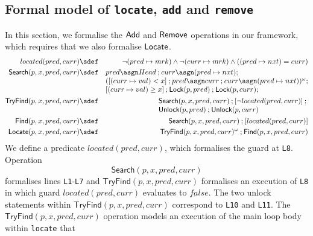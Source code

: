 \documentclass{article}
\theoremstyle{plain}
\theoremstyle{definition}
\def\ch{\mathbin{;}}
\begin{document}
\subsection{Formal model of \texttt{locate}, \texttt{add} and
  \texttt{remove}} 

In this section, we formalise the ${\sf Add}$ and ${\sf Remove}$
operations in our framework, which requires that we also formalise
${\sf Locate}$.
\begin{eqnarray*}
  located(pred,curr) & \sdef & \neg
  (pred\mapsto mrk) \land \neg (curr\mapsto mrk) \land
  ((pred\mapsto nxt) = curr) \\
  \mathsf{Search}(p, x, pred, curr) & \sdef & 
  \begin{array}[t]{@{}l@{}}
    pred \asgn Head \ch curr \asgn (pred \mapsto nxt) \ch \\
    ({[}(curr\mapsto val) < x{]}
    \ch pred \asgn curr \ch curr \asgn (pred\mapsto nxt))^\omega \ch \\
    {[}(curr\mapsto val)
    \geq x{]} \ch \mathsf{Lock}(p, pred) \ch \mathsf{Lock}(p, curr) \ch 
  \end{array}
  \\
  \mathsf{TryFind}(p, x, pred, curr) & \sdef &
  \begin{array}[t]{@{}l@{}}
    \mathsf{Search}(p, x, pred, curr) \ch 
    {[} \neg located(pred,curr) {]} \ch {} \\
    \mathsf{Unlock}(p, pred)
    \ch \mathsf{Unlock}(p, curr)
  \end{array}
  \\
  \mathsf{Find}(p, x, pred, curr) & \sdef &
  \begin{array}[t]{@{}l@{}}
    \mathsf{Search}(p, x, pred, curr) \ch 
    {[}located(pred,curr) {]} 
  \end{array}
  \\
  \mathsf{Locate}(p, x, pred, curr) & \sdef &
  \mathsf{TryFind}(p, x,pred,curr)^\omega \ch \mathsf{Find}(p, x,pred,curr)
\end{eqnarray*}
We define a predicate $located(pred, curr)$, which formalises the
guard at \texttt{L8}. Operation 
$$
\mathsf{Search}(p, x, pred, curr)
$$ 
formalises lines \texttt{L1}-\texttt{L7} and $\mathsf{TryFind}(p, x,
pred, curr)$ formalises an execution of \texttt{L8} in which guard
$located(pred, curr)$ evaluates to $false$. The two unlock statements
within $\mathsf{TryFind}(p, x, pred, curr)$ correspond to \texttt{L10}
and \texttt{L11}. The $\mathsf{TryFind}(p, x, pred, curr)$ operation
models an execution of the main loop body within \texttt{locate} that
\end{document}
